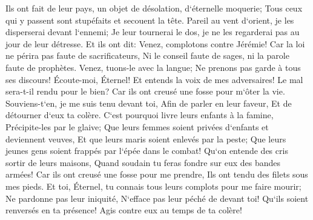 \verse Ils ont fait de leur pays, un objet de désolation, d`éternelle moquerie; Tous ceux qui y passent sont stupéfaits et secouent la tête. 
\verse Pareil au vent d`orient, je les disperserai devant l`ennemi; Je leur tournerai le dos, je ne les regarderai pas au jour de leur détresse. 
\verse Et ils ont dit: Venez, complotons contre Jérémie! Car la loi ne périra pas faute de sacrificateurs, Ni le conseil faute de sages, ni la parole faute de prophètes. Venez, tuons-le avec la langue; Ne prenons pas garde à tous ses discours! 
\verse Écoute-moi, Éternel! Et entends la voix de mes adversaires! 
\verse Le mal sera-t-il rendu pour le bien? Car ils ont creusé une fosse pour m`ôter la vie. Souviens-t`en, je me suis tenu devant toi, Afin de parler en leur faveur, Et de détourner d`eux ta colère. 
\verse C`est pourquoi livre leurs enfants à la famine, Précipite-les par le glaive; Que leurs femmes soient privées d`enfants et deviennent veuves, Et que leurs maris soient enlevés par la peste; Que leurs jeunes gens soient frappés par l`épée dans le combat! 
\verse Qu`on entende des cris sortir de leurs maisons, Quand soudain tu feras fondre sur eux des bandes armées! Car ils ont creusé une fosse pour me prendre, Ils ont tendu des filets sous mes pieds. 
\verse Et toi, Éternel, tu connais tous leurs complots pour me faire mourir; Ne pardonne pas leur iniquité, N`efface pas leur péché de devant toi! Qu`ils soient renversés en ta présence! Agis contre eux au temps de ta colère! 

